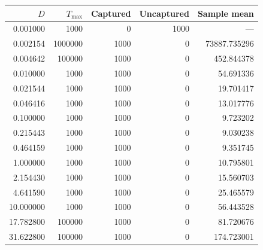 \begin{tabular}{rrrrr}
\toprule
$D$ & $T_{\max}$ & Captured & Uncaptured & Sample mean \\
\midrule
0.001000 & 1000 & 0 & 1000 & --- \\
0.002154 & 1000000 & 1000 & 0 & 73887.735296 \\
0.004642 & 100000 & 1000 & 0 & 452.844378 \\
0.010000 & 1000 & 1000 & 0 & 54.691336 \\
0.021544 & 1000 & 1000 & 0 & 19.701417 \\
0.046416 & 1000 & 1000 & 0 & 13.017776 \\
0.100000 & 1000 & 1000 & 0 & 9.723202 \\
0.215443 & 1000 & 1000 & 0 & 9.030238 \\
0.464159 & 1000 & 1000 & 0 & 9.351745 \\
1.000000 & 1000 & 1000 & 0 & 10.795801 \\
2.154430 & 1000 & 1000 & 0 & 15.560703 \\
4.641590 & 1000 & 1000 & 0 & 25.465579 \\
10.000000 & 1000 & 1000 & 0 & 56.443528 \\
17.782800 & 100000 & 1000 & 0 & 81.720676 \\
31.622800 & 100000 & 1000 & 0 & 174.723001 \\
\bottomrule
\end{tabular}
